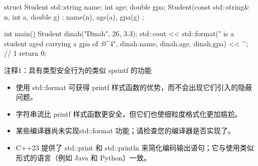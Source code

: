 
\begin{cpp}
struct Student {
  std::string name;
  int age;
  double gpa;
  Student(const std::string& n, int a, double g) : name(n), age(a), gpa(g) {}
};

int main() {
  Student dinah("Dinah", 26, 3.3);
  std::cout << std::format("{} is a student aged {} carrying a gpa of {:0^4}", dinah.name, dinah.age, dinah.gpa) << '\n'; // 1
  return 0;
}
\end{cpp}

{\footnotesize
注释1：具有类型安全行为的类似 sprintf 的功能
}


\begin{itemize}
\item
使用 std::format 可获得 printf 样式函数的优势，而不会出现它们引入的隐蔽问题。

\item
字符串流比 printf 样式函数更安全，但它们也使细粒度格式化更加尴尬。

\item
某些编译器尚未实现std::format 功能；请检查您的编译器是否实现了。

\item
C++23 提供了 std::print 和 std::println 来简化编码输出语句；它与使用类似形式的语言（例如 Java 和 Python）一致。
\end{itemize}








